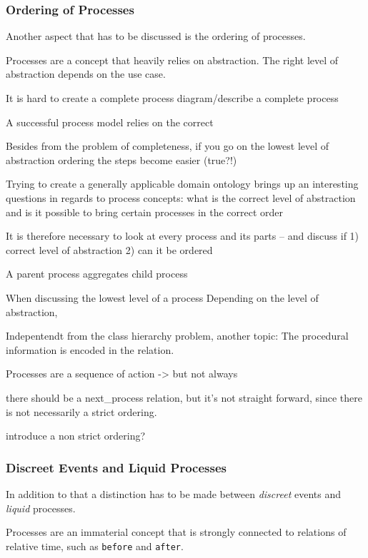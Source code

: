 \documentclass[a4paper, DIV=13, BCOR=0cm]{scrbook}
\newcommand{\relation}[1]{\texttt{#1}}
\begin{document}
\subsubsection{Ordering of Processes }
Another aspect that has to be discussed is the ordering of processes.

Processes are a concept that heavily relies on abstraction. The right level of abstraction depends on the use case.

\begin{compactenum}
	\item It is hard to create a complete process diagram/describe a complete process
	\item A successful process model relies on the correct
	\item Besides from the problem of completeness, if you go on the lowest level of abstraction ordering the steps become easier (true?!)
	\item Trying to create a generally applicable domain ontology brings up an interesting questions in regards to process concepts: what is the correct level of abstraction and is it possible to bring certain processes in the correct order
	\item It is therefore necessary to look at every process and its parts -- and discuss if 1) correct level of abstraction 2) can it be ordered
	\item A parent process aggregates child process

	\item When discussing the lowest level of a process Depending on the level of abstraction,
	\item Indepentendt from the class hierarchy problem, another topic: The procedural information is encoded in the relation.
	\item Processes are a sequence of action -> but not always
	\item there should be a next\_process relation, but it's not straight forward, since there is not necessarily a strict ordering.
	\item introduce a non strict ordering?
\end{compactenum}

\subsubsection{Discreet Events and Liquid Processes}

\begin{compactenum}
\item In addition to that a distinction has to be made between \textit{discreet} events and \textit{liquid} processes. \cite[p.\,447]{Russell:2010aa}
\item Processes are an immaterial concept that is strongly connected to relations of relative time, such as \relation{before} and \relation{after}.
\end{compactenum}
\end{document}
